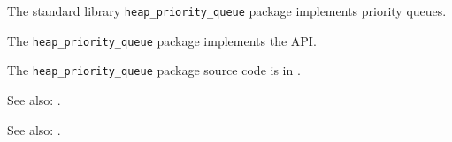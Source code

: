 
The standard library {\tt heap\_priority\_queue} package implements priority queues.

The {\tt heap\_priority\_queue} package implements the  API.

The {\tt heap\_priority\_queue} package source code is in .

See also:  .

See also:  .



